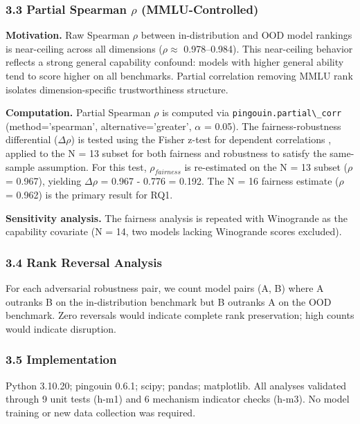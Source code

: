 \subsubsection{3.3 Partial Spearman $\rho$ (MMLU-Controlled)}

\textbf{Motivation.} Raw Spearman $\rho$ between in-distribution and OOD model rankings is near-ceiling across all dimensions ($\rho \approx$ 0.978--0.984). This near-ceiling behavior reflects a strong general capability confound: models with higher general ability tend to score higher on all benchmarks. Partial correlation removing MMLU rank isolates dimension-specific trustworthiness structure.

\textbf{Computation.} Partial Spearman $\rho$ is computed via \texttt{pingouin.partial\textbackslash \_corr} (method='spearman', alternative='greater', $\alpha$ = 0.05). The fairness-robustness differential ($\Delta\rho$) is tested using the Fisher z-test for dependent correlations \citep{Meng1992}, applied to the N = 13 subset for both fairness and robustness to satisfy the same-sample assumption. For this test, $\rho_{fairness}$ is re-estimated on the N = 13 subset ($\rho$ = 0.967), yielding $\Delta\rho$ = 0.967 - 0.776 = 0.192. The N = 16 fairness estimate ($\rho$ = 0.962) is the primary result for RQ1.

\textbf{Sensitivity analysis.} The fairness analysis is repeated with Winogrande as the capability covariate (N = 14, two models lacking Winogrande scores excluded).

\subsubsection{3.4 Rank Reversal Analysis}

For each adversarial robustness pair, we count model pairs (A, B) where A outranks B on the in-distribution benchmark but B outranks A on the OOD benchmark. Zero reversals would indicate complete rank preservation; high counts would indicate disruption.

\subsubsection{3.5 Implementation}

Python 3.10.20; pingouin 0.6.1; scipy; pandas; matplotlib. All analyses validated through 9 unit tests (h-m1) and 6 mechanism indicator checks (h-m3). No model training or new data collection was required.

